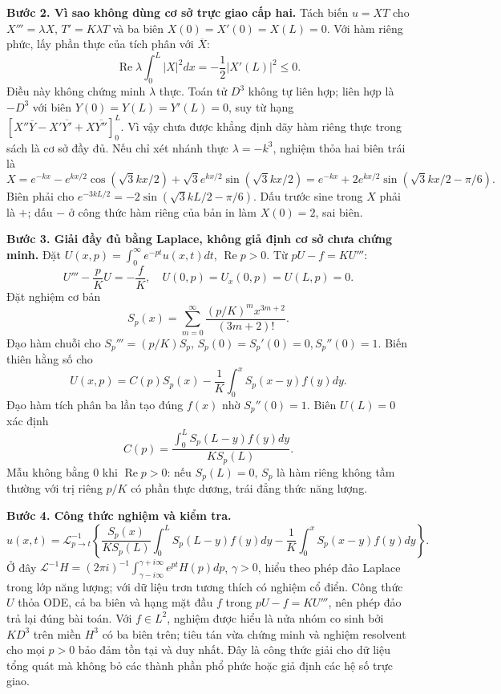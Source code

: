\documentclass[10pt,a4paper]{article}
\begin{document}
\textbf{Bước 2. Vì sao không dùng cơ sở trực giao cấp hai.}
Tách biến $u=XT$ cho $X'''=\lambda X$, $T'=K\lambda T$ và ba biên $X(0)=X'(0)=X(L)=0$. Với hàm riêng phức, lấy phần thực của tích phân với $\overline X$:
\[\operatorname{Re}\lambda\int_0^L|X|^2dx=-\frac12|X'(L)|^2\le0.\]
Điều này không chứng minh $\lambda$ thực. Toán tử $D^3$ không tự liên hợp; liên hợp là $-D^3$ với biên $Y(0)=Y(L)=Y'(L)=0$, suy từ hạng $[X''\overline Y-X'\overline{Y'}+X\overline{Y''}]_0^L$. Vì vậy chưa được khẳng định dãy hàm riêng thực trong sách là cơ sở đầy đủ.
Nếu chỉ xét nhánh thực $\lambda=-k^3$, nghiệm thỏa hai biên trái là
\[X=e^{-kx}-e^{kx/2}\cos(\sqrt3kx/2)+\sqrt3e^{kx/2}\sin(\sqrt3kx/2)
=e^{-kx}+2e^{kx/2}\sin(\sqrt3kx/2-\pi/6).\]
Biên phải cho $e^{-3kL/2}=-2\sin(\sqrt3kL/2-\pi/6)$. Dấu trước sine trong $X$ phải là $+$; dấu $-$ ở công thức hàm riêng của bản in làm $X(0)=2$, sai biên.

\textbf{Bước 3. Giải đầy đủ bằng Laplace, không giả định cơ sở chưa chứng minh.}
Đặt $U(x,p)=\int_0^\infty e^{-pt}u(x,t)dt$, $\operatorname{Re}p>0$. Từ $pU-f=KU'''$:
\[U'''-\frac pK U=-\frac fK,\quad U(0,p)=U_x(0,p)=U(L,p)=0.\]
Đặt nghiệm cơ bản
\[S_p(x)=\sum_{m=0}^\infty\frac{(p/K)^m x^{3m+2}}{(3m+2)!}.\]
Đạo hàm chuỗi cho $S_p'''=(p/K)S_p$, $S_p(0)=S_p'(0)=0,S_p''(0)=1$. Biến thiên hằng số cho
\[U(x,p)=C(p)S_p(x)-\frac1K\int_0^xS_p(x-y)f(y)dy.\]
Đạo hàm tích phân ba lần tạo đúng $f(x)$ nhờ $S_p''(0)=1$. Biên $U(L)=0$ xác định
\[C(p)=\frac{\int_0^LS_p(L-y)f(y)dy}{KS_p(L)}.\]
Mẫu không bằng $0$ khi $\operatorname{Re}p>0$: nếu $S_p(L)=0$, $S_p$ là hàm riêng không tầm thường với trị riêng $p/K$ có phần thực dương, trái đẳng thức năng lượng.

\textbf{Bước 4. Công thức nghiệm và kiểm tra.}
\[
u(x,t)=\mathcal L^{-1}_{p\to t}
\left\{\frac{S_p(x)}{KS_p(L)}\int_0^LS_p(L-y)f(y)dy
-\frac1K\int_0^xS_p(x-y)f(y)dy\right\}.
\]
Ở đây $\mathcal L^{-1}H=(2\pi i)^{-1}\int_{\gamma-i\infty}^{\gamma+i\infty}e^{pt}H(p)dp$, $\gamma>0$, hiểu theo phép đảo Laplace trong lớp năng lượng; với dữ liệu trơn tương thích có nghiệm cổ điển. Công thức $U$ thỏa ODE, cả ba biên và hạng mặt đầu $f$ trong $pU-f=KU'''$, nên phép đảo trả lại đúng bài toán. Với $f\in L^2$, nghiệm được hiểu là nửa nhóm co sinh bởi $KD^3$ trên miền $H^3$ có ba biên trên; tiêu tán vừa chứng minh và nghiệm resolvent cho mọi $p>0$ bảo đảm tồn tại và duy nhất. Đây là công thức giải cho dữ liệu tổng quát mà không bỏ các thành phần phổ phức hoặc giả định các hệ số trực giao.
\end{document}

